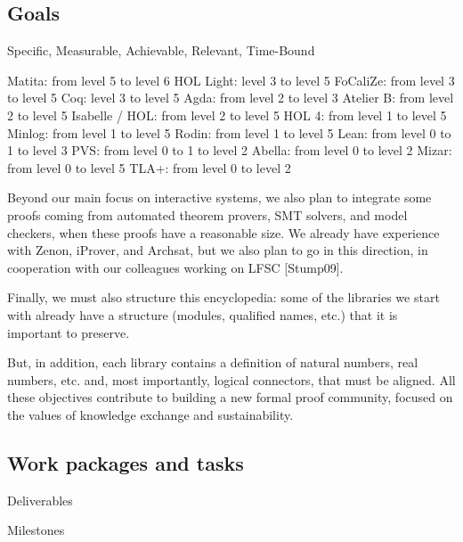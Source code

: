 \subsection{Goals}

Specific, Measurable, Achievable, Relevant, Time-Bound

Matita: from level 5 to level 6
HOL Light: level 3 to level 5
FoCaliZe: from level 3 to level 5
Coq: level 3 to level 5
Agda: from level 2 to level 3
Atelier B: from level 2 to level 5
Isabelle / HOL: from level 2 to level 5
HOL 4: from level 1 to level 5
Minlog: from level 1 to level 5
Rodin: from level 1 to level 5
Lean: from level 0 to 1 to level 3
PVS: from level 0 to 1 to level 2
Abella: from level 0 to level 2
Mizar: from level 0 to level 5
TLA+: from level 0 to level 2

Beyond our main focus on interactive systems, we also plan to
integrate some proofs coming from automated theorem provers, SMT
solvers, and model checkers, when these proofs have a reasonable
size. We already have experience with Zenon, iProver, and Archsat, but
we also plan to go in this direction, in cooperation with our
colleagues working on LFSC [Stump09].

Finally, we must also structure this encyclopedia: some of the
libraries we start with already have a structure (modules, qualified
names, etc.) that it is important to preserve.

But, in addition, each library contains a definition of natural
numbers, real numbers, etc. and, most importantly, logical connectors,
that must be aligned.  All these objectives contribute to building a
new formal proof community, focused on the values of knowledge
exchange and sustainability.


\subsection{Work packages and tasks}



Deliverables


Milestones

